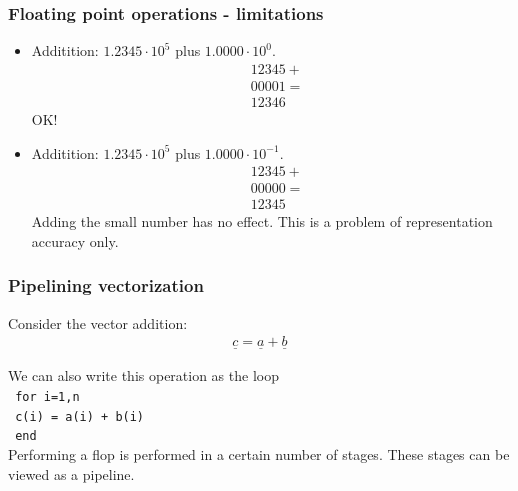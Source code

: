 \documentclass{beamer}
\begin{document}
\begin{frame}\frametitle{Floating point operations - limitations}
  \begin{itemize}
    \item Additition: $1.2345\cdot 10^5$ plus $1.0000\cdot 10^0$.
        \[
          \begin{split}
            & 12345 + \\
            & 00001 = \\
            & 12346
          \end{split}
        \]
        OK!
      \item Additition: $1.2345\cdot 10^5$ plus $1.0000\cdot 10^{-1}$.
        \[
          \begin{split}
            & 12345 + \\
            & 00000 = \\
            & 12345
          \end{split}
        \]
        Adding the small number has no effect. This is a problem of representation accuracy only.
  \end{itemize}
\end{frame}

\begin{frame}\frametitle{Pipelining vectorization}
Consider the vector addition: 
\begin{align*}
 \underline{c} = \underline{a} + \underline{b} 
 \end{align*}
\vspace{.5cm}

We can also write this operation as the loop\\
\vspace{.5cm}
\hspace{3cm}\texttt{   for i=1,n}           \\
\hspace{4cm}\texttt{          c(i) = a(i) + b(i)}\\
\hspace{3cm}\texttt{   end} \\
Performing a flop is performed in a certain number of stages. These
stages can be viewed as a pipeline.
\end{frame}
\end{document}
